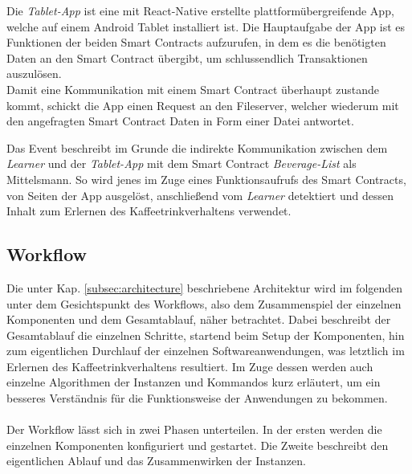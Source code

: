 Die \textit{Tablet-App} ist eine mit React-Native \cite{RN:ReactNative} erstellte plattformübergreifende App, welche auf einem Android Tablet installiert ist. Die Hauptaufgabe der App ist es Funktionen der beiden Smart Contracts aufzurufen, in dem es die benötigten Daten an den Smart Contract übergibt, um schlussendlich Transaktionen auszulösen.\\
Damit eine Kommunikation mit einem Smart Contract überhaupt zustande kommt, schickt die App einen Request an den Fileserver, welcher wiederum mit den angefragten Smart Contract Daten in Form einer Datei antwortet.

Das Event beschreibt im Grunde die indirekte Kommunikation zwischen dem \textit{Learner} und der \textit{Tablet-App} mit dem Smart Contract \textit{Beverage-List} als Mittelsmann. So wird jenes im Zuge eines Funktionsaufrufs des Smart Contracts, von Seiten der App ausgelöst, anschließend vom \textit{Learner} detektiert und dessen Inhalt zum Erlernen des Kaffeetrinkverhaltens verwendet.

\subsection{Workflow}
\label{subsec:workflow}
Die unter Kap. \ref{subsec:architecture} beschriebene Architektur wird im folgenden unter dem Gesichtspunkt des Workflows, also dem Zusammenspiel der einzelnen Komponenten und dem Gesamtablauf, näher betrachtet. Dabei beschreibt der Gesamtablauf die einzelnen Schritte, startend beim Setup der Komponenten, hin zum eigentlichen Durchlauf der einzelnen Softwareanwendungen, was letztlich im Erlernen des Kaffeetrinkverhaltens resultiert. Im Zuge dessen werden auch einzelne Algorithmen der Instanzen und Kommandos kurz erläutert, um ein besseres Verständnis für die Funktionsweise der Anwendungen zu bekommen. \\\\
Der Workflow lässt sich in zwei Phasen unterteilen. In der ersten werden die einzelnen Komponenten konfiguriert und gestartet. Die Zweite beschreibt den eigentlichen Ablauf und das Zusammenwirken der Instanzen.

